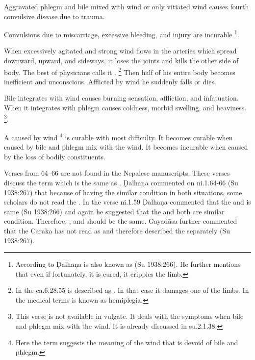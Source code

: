 \begin{translation}
\item[58]

	Aggravated phlegm and bile mixed with wind or only vitiated wind causes
	fourth convulsive disease due to trauma.

\item[59]

	Convulsions due to miscarriage, excessive bleeding, and injury are
	incurable \footnote{According to Ḍalhaṇa  is
	also known as  (Su 1938:266). He further mentions that even
	if fortunately, it is cured, it cripples the limb.}.

\item[60--62]

	When excessively agitated and strong wind flows in the arteries which
	spread downward, upward, and sideways, it loses the joints and kills the
	other side of body. The best of physicians calls it
	.  \footnote{In the ca.6.28.55 
	is described as . In that case it damages one
	of the limbs.  In the medical terms  is known
	as hemiplegia.} Then half of his entire body becomes inefficient and
	unconscious. Afflicted by wind he suddenly falls or dies.

\item[62.1]

	Bile integrates with wind causes burning sensation, affliction, and
	infatuation. When it integrates with phlegm causes coldness, morbid
	swelling, and heaviness. \footnote{This verse is not available in
	vulgate. It deals with the symptoms when bile and phlegm mix with the
	wind. It is already discussed in su.2.1.38.}. 

\item[63]

	A  caused by wind \footnote{Here the term
	 suggests the meaning of the wind that is devoid of bile and
	phlegm.} is curable with most difficulty. It becomes curable when caused
	by bile and phlegm mix with the wind. It becomes incurable when caused
	by the loss of bodily constituents.

\item[64--66]

	Verses from 64--66 are not found in the Nepalese manuscripts.  These
	verses discuss the term  which
	is the same as . Ḍalhaṇa commented on ni.1.64-66 (Su
	1938:267) that because of having the similar condition in both
	situations, some scholars do not read the . In the verse
	ni.1.59 Ḍalhaṇa commented that the  and  is same
	(Su 1938:266) and again he suggested that the  and
	 both are similar condition. Therefore, ,
	 and  should be the same. Gayadāsa further
	commented that the Caraka has not read  as  and
	therefore described the  separately (Su 1938:267).


\end{translation}

